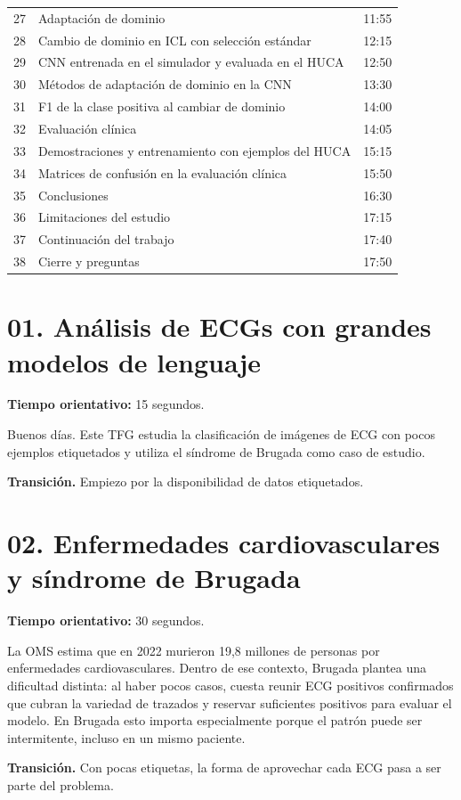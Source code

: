 \documentclass[11pt,a4paper]{article}
\begin{document}
\begin{longtable}{p{12mm}p{112mm}r}
27 & Adaptación de dominio & 11:55\\
28 & Cambio de dominio en ICL con selección estándar & 12:15\\
29 & CNN entrenada en el simulador y evaluada en el HUCA & 12:50\\
30 & Métodos de adaptación de dominio en la CNN & 13:30\\
31 & F1 de la clase positiva al cambiar de dominio & 14:00\\
32 & Evaluación clínica & 14:05\\
33 & Demostraciones y entrenamiento con ejemplos del HUCA & 15:15\\
34 & Matrices de confusión en la evaluación clínica & 15:50\\
35 & Conclusiones & 16:30\\
36 & Limitaciones del estudio & 17:15\\
37 & Continuación del trabajo & 17:40\\
38 & Cierre y preguntas & 17:50\\
\bottomrule\end{longtable}
\section*{01. Análisis de ECGs con grandes modelos de lenguaje}
\textbf{Tiempo orientativo: }15 segundos.

Buenos días. Este TFG estudia la clasificación de imágenes de ECG con pocos ejemplos etiquetados y utiliza el síndrome de Brugada como caso de estudio.

\textbf{Transición.} Empiezo por la disponibilidad de datos etiquetados.

\section*{02. Enfermedades cardiovasculares y síndrome de Brugada}
\textbf{Tiempo orientativo: }30 segundos.

La OMS estima que en 2022 murieron 19,8 millones de personas por enfermedades cardiovasculares. Dentro de ese contexto, Brugada plantea una dificultad distinta: al haber pocos casos, cuesta reunir ECG positivos confirmados que cubran la variedad de trazados y reservar suficientes positivos para evaluar el modelo. En Brugada esto importa especialmente porque el patrón puede ser intermitente, incluso en un mismo paciente.

\textbf{Transición.} Con pocas etiquetas, la forma de aprovechar cada ECG pasa a ser parte del problema.
\end{document}
